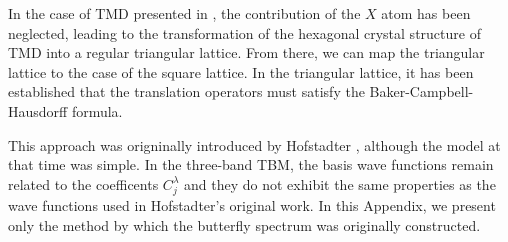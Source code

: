 \documentclass{report}
\begin{document}
In the case of TMD presented in \cite{PhysRevB.88.085433}, the contribution of the
$X$ atom has been neglected, leading to the transformation of the hexagonal crystal structure of TMD into a regular triangular lattice. From there, we can map the triangular lattice to the case of the square lattice. In the triangular lattice, it has been established that the translation operators must satisfy the Baker-Campbell-Hausdorff formula.

This approach was origninally introduced by Hofstadter \cite{PhysRevB.14.2239}, although the model at that time was simple. In the three-band \ac{TBM}, the basis wave functions remain related to the coefficents $C_{j}^{\lambda}$ and they do not exhibit the same properties as the wave functions used in Hofstadter's original work. In this Appendix, we present only the method by which the butterfly spectrum was originally constructed.
\end{document}
